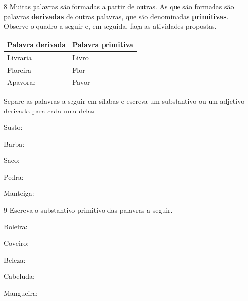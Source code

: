 \num{8} Muitas palavras são formadas a partir de outras. As que são formadas são
palavras \textbf{derivadas} de outras palavras, que são denominadas
\textbf{primitivas}. Observe o quadro a seguir e, em seguida, faça as
atividades propostas.

\begin{center}
\begin{tabular}{ll}
\hline
\textbf{Palavra derivada} & \textbf{Palavra primitiva} \\ \hline
Livraria & Livro \\
Floreira & Flor \\
Apavorar & Pavor \\ \hline
\end{tabular}
\end{center}

Separe as palavras a seguir em sílabas e escreva um substantivo ou um
adjetivo derivado para cada uma delas.

\begin{escolha}
\item Susto: 

\item
  Barba: 

\item
  Saco: 

\item
  Pedra: 

\item
  Manteiga: 
\end{escolha}

\num{9} Escreva o substantivo primitivo das palavras a seguir.

\begin{escolha}
\item Boleira: 

\item Coveiro: 

\item Beleza: 

\item Cabeluda: 

\item Mangueira: 
\end{escolha}

